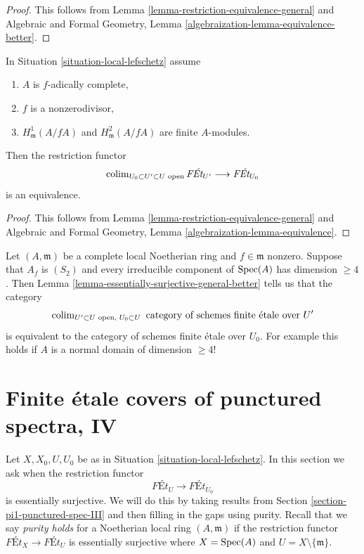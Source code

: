 \begin{proof}
This follows from Lemma \ref{lemma-restriction-equivalence-general}
and
Algebraic and Formal Geometry, Lemma
\ref{algebraization-lemma-equivalence-better}.
\end{proof}

\begin{lemma}
\label{lemma-essentially-surjective-general}
In Situation \ref{situation-local-lefschetz} assume
\begin{enumerate}
\item $A$ is $f$-adically complete,
\item $f$ is a nonzerodivisor,
\item $H^1_\mathfrak m(A/fA)$ and $H^2_\mathfrak m(A/fA)$
are finite $A$-modules.
\end{enumerate}
Then the restriction functor
$$
\mathop{\mathrm{colim}}\nolimits_{U_0 \subset U' \subset U\text{ open}} \textit{F\'Et}_{U'}
\longrightarrow
\textit{F\'Et}_{U_0}
$$
is an equivalence.
\end{lemma}

\begin{proof}
This follows from Lemma \ref{lemma-restriction-equivalence-general}
and
Algebraic and Formal Geometry, Lemma
\ref{algebraization-lemma-equivalence}.
\end{proof}

\begin{remark}
\label{remark-combine}
Let $(A, \mathfrak m)$ be a complete local Noetherian ring and
$f \in \mathfrak m$ nonzero. Suppose that $A_f$ is $(S_2)$ and
every irreducible component of $\mathop{\mathrm{Spec}}(A)$ has dimension $\geq 4$.
Then Lemma \ref{lemma-essentially-surjective-general-better}
tells us that the category
$$
\mathop{\mathrm{colim}}\nolimits\nolimits_{U' \subset U\text{ open, }U_0 \subset U}
\text{ category of schemes finite \'etale over }U'
$$
is equivalent to the category of schemes finite \'etale over $U_0$.
For example this holds if $A$ is a normal domain of dimension $\geq 4$!
\end{remark}




\section{Finite \'etale covers of punctured spectra, IV}
\label{section-pi1-punctured-spec-IV}

\noindent
Let $X, X_0, U, U_0$ be as in Situation \ref{situation-local-lefschetz}.
In this section we ask when the restriction functor
$$
\textit{F\'Et}_U
\longrightarrow
\textit{F\'Et}_{U_0}
$$
is essentially surjective.
We will do this by taking results from
Section \ref{section-pi1-punctured-spec-III}
and then filling in the gaps using purity. Recall that
we say {\it purity holds} for a Noetherian local ring
$(A, \mathfrak m)$ if the restriction functor
$\textit{F\'Et}_X \to \textit{F\'Et}_U$ is essentially
surjective where $X = \mathop{\mathrm{Spec}}(A)$ and $U = X \setminus \{\mathfrak m\}$.

